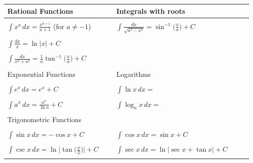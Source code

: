 \documentclass{standalone}
\begin{document}
\begin{tabular}{|p{0.4\linewidth} |p{0.5\linewidth} |}
  \hline
  Rational Functions & Integrals with roots \\ \hline \\
  $\displaystyle{\int x^a\, dx = \frac{x^{a+1}}{a+1}}$ (for $a\neq -1$) & $\displaystyle{\int \frac{dx}{\sqrt{a^2-x^2}}} = \sin^{-1}\big(\tfrac{x}{a} \big) + C$  \\ \\ 
  $\displaystyle{\int \frac{dx}{x} = \ln \lvert x  \rvert + C}$ &  \\ \\
  $\displaystyle{\int \frac{dx}{x^2+a^2} = \tfrac{1}{a} \tan^{-1} \big( \tfrac{x}{a} \big) + C}$ & \\ \\ \hline
  Exponential Functions & Logarithms \\ \hline \\
  $\displaystyle{\int e^x\, dx =  e^x + C }$ & $\displaystyle{\int \ln x\, dx = }$ \\ \\
  $\displaystyle{\int a^x\, dx = \frac{a^x}{\ln a}+C}$ & $\displaystyle{\int \log_a x\, dx = }$ \\ \\  \hline
  Trigonometric Functions & \\ \hline \\
  $\displaystyle{\int \sin x\, dx = -\cos x + C}$ & $\displaystyle{\int \cos x\, dx = \sin x + C}$  \\ \\
  $\displaystyle{\int \csc x\, dx = \ln \lvert \tan \big( \tfrac{x}{2}) \rvert + C}$ & $\displaystyle{\int \sec x\, dx = \ln \lvert \sec x + \tan x \rvert + C}$ \\ \\
  \end{tabular}
\end{document}
